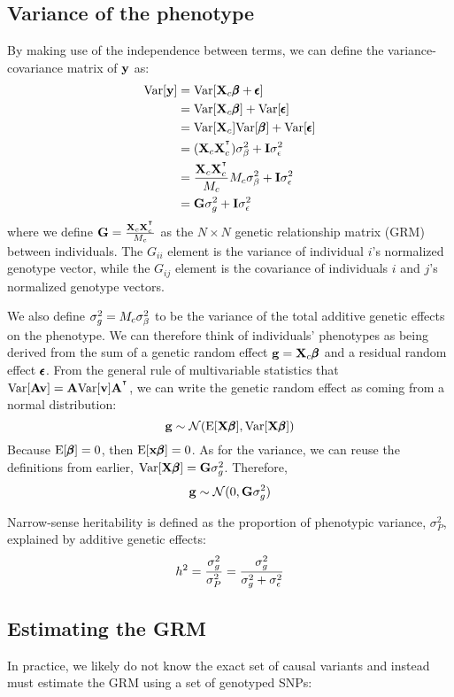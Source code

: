 \documentclass[12pt]{article}
\begin{document}
\subsection{Variance of the phenotype}
By making use of the independence between terms, we can define the variance-covariance matrix of $\mathbf{y}$ as:
\begin{align*}
    \mathrm{Var}[\mathbf{y}] &= \mathrm{Var}[\mathbf{X}_c \pmb{\beta} + \pmb{\epsilon}] \\
    &= \mathrm{Var}[\mathbf{X}_c \pmb{\beta}] + \mathrm{Var}[\pmb{\epsilon}] \\
    &= \mathrm{Var}[\mathbf{X}_c] \mathrm{Var}[\pmb{\beta}] + \mathrm{Var}[\pmb{\epsilon}] \\
    &= (\mathbf{X}_c \mathbf{X}_c^{^\intercal}) \sigma_{\beta}^2 + \mathbf{I} \sigma_{\epsilon}^2 \\
    &= \frac{\mathbf{X}_c \mathbf{X}_c^{^\intercal}}{M_c} M_c \sigma_{\beta}^2 + \mathbf{I} \sigma_{\epsilon}^2 \\
    &= \mathbf{G} \sigma_g^2 + \mathbf{I} \sigma_{\epsilon}^2 \\
\end{align*}
where we define $\mathbf{G} = \frac{\mathbf{X}_c \mathbf{X}_c^{^\intercal}}{M_c}$ as the $N \times N$ genetic relationship matrix (GRM) between individuals.
The $G_{ii}$ element is the variance of individual $i$'s normalized genotype vector, while the $G_{ij}$ element is the covariance of individuals $i$ and $j$'s normalized genotype vectors.

We also define $\sigma_g^2 = M_c \sigma_{\beta}^2$ to be the variance of the total additive genetic effects on the phenotype. We can therefore think of individuals' phenotypes as being derived from the sum of a genetic random effect $\mathbf{g} = \mathbf{X}_c \pmb{\beta}$ and a residual random effect $\pmb{\epsilon}$. From the general rule of multivariable statistics that $\mathrm{Var}[\mathbf{A} \mathbf{v}] = \mathbf{A} \mathrm{Var}[\mathbf{v}] \mathbf{A}^{^\intercal}$, we can write the genetic random effect as coming from a normal distribution:
$$ \mathbf{g} \sim \mathcal{N}(\mathrm{E}[\mathbf{X} \pmb{\beta}], \mathrm{Var}[\mathbf{X} \pmb{\beta}]) $$
Because $\mathrm{E}[\pmb{\beta}] = 0$, then $\mathrm{E}[\mathbf{x} \pmb{\beta}] = 0$. As for the variance, we can reuse the definitions from earlier, $\mathrm{Var}[\mathbf{X} \pmb{\beta}] =  \mathbf{G} \sigma_g^2$. Therefore,
$$ \mathbf{g} \sim \mathcal{N}(0, \mathbf{G} \sigma_g^2) $$

Narrow-sense heritability is defined as the proportion of phenotypic variance, $\sigma_P^2$, explained by additive genetic effects:
$$ h^2 = \frac{\sigma_g^2}{\sigma_P^2} = \frac{\sigma_g^2}{\sigma_g^2 + \sigma_{\epsilon}^2} $$

\subsection{Estimating the GRM}

In practice, we likely do not know the exact set of causal variants and instead must estimate the GRM using a set of genotyped SNPs:
\end{document}
